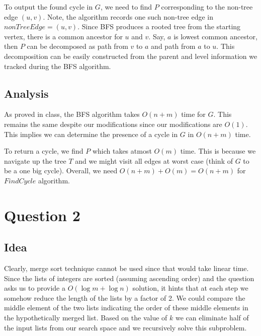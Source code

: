 \documentclass{article}
\begin{document}
    To output the found cycle in $G$, we need to find $P$ corresponding to the non-tree edge $(u, v)$. Note, the algorithm records one such non-tree edge in $nonTreeEdge = (u, v)$. Since BFS produces a rooted tree from the starting vertex, there is a common ancestor for $u$ and $v$. Say, $a$ is lowest common ancestor, then $P$ can be decomposed as path from $v$ to $a$ and path from $a$ to $u$. This decomposition can be easily constructed from the parent and level information we tracked during the BFS algorithm.

    \subsection*{Analysis}
    As proved in class, the BFS algorithm takes $O(n+m)$ time for $G$. This remains the same despite our modifications since our modifications are $O(1)$. This implies we can determine the presence of a cycle in $G$ in $O(n+m)$ time.

    To return a cycle, we find $P$ which takes atmost $O(m)$ time. This is because we navigate up the tree $T$ and we might visit all edges at worst case (think of $G$ to be a one big cycle). Overall, we need $O(n+m)+O(m) = O(n+m)$ for $FindCycle$ algorithm.

    \section*{Question 2}

    \subsection*{Idea}
    Clearly, merge sort technique cannot be used since that would take linear time. Since the lists of integers are sorted (assuming ascending order) and the question asks us to provide a $O(\log m + \log n)$ solution, it hints that at each step we somehow reduce the length of the lists by a factor of 2. We could compare the middle element of the two lists indicating the order of these middle elements in the hypothetically merged list. Based on the value of $k$ we can eliminate half of the input lists from our search space and we recursively solve this subproblem.
    
\end{document}
